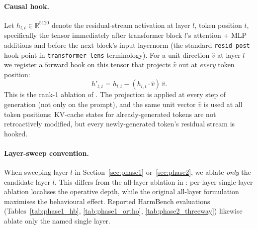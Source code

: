 \documentclass{article}
\begin{document}
\paragraph{Causal hook.} Let $h_{l,t} \in \mathbb{R}^{5120}$ denote
the residual-stream activation at layer $l$, token position $t$,
specifically the tensor immediately after transformer block $l$'s
attention + MLP additions and before the next block's input
layernorm (the standard \texttt{resid\_post} hook point in
\texttt{transformer\_lens} terminology). For a unit direction
$\hat{v}$ at layer $l$ we register a forward hook on this tensor
that projects $\hat{v}$ out at \emph{every} token position:
\begin{equation*}
  h'_{l,t} = h_{l,t} - (h_{l,t} \cdot \hat{v})\,\hat{v}.
\end{equation*}
This is the rank-1 ablation of \citet{arditi2024refusal}. The
projection is applied at every step of generation (not only on the
prompt), and the same unit vector $\hat{v}$ is used at all token
positions; KV-cache states for already-generated tokens are not
retroactively modified, but every newly-generated token's
residual stream is hooked.

\paragraph{Layer-sweep convention.} When sweeping layer $l$ in
Section~\ref{sec:phase1} or~\ref{sec:phase2}, we ablate
\emph{only} the candidate layer $l$. This differs from the all-layer
ablation in \citet{arditi2024refusal}: per-layer single-layer
ablation localises the operative depth, while the original
all-layer formulation maximises the behavioural effect. Reported
HarmBench evaluations (Tables~\ref{tab:phase1_hb},
\ref{tab:phase1_ortho}, \ref{tab:phase2_threeway}) likewise ablate
only the named single layer.
\end{document}
